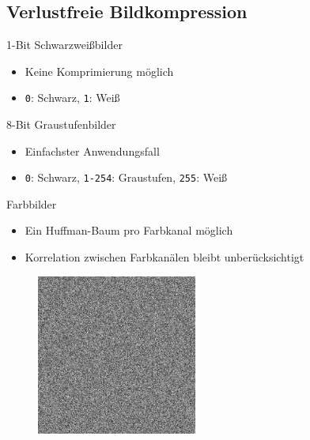 \documentclass[xcolor=dvipsnames,presentation]{beamer}    %
\newenvironment{witemize}{\itemize\setlength{\itemsep}{1em}}{\enditemize}
\begin{document}
\subsection{Verlustfreie Bildkompression}

\begin{frame}{\insertsubsection}
\begin{witemize}
\item<1-> 1-Bit Schwarzweißbilder
  \begin{itemize}
    \item Keine Komprimierung möglich
    \item {\tt0}: Schwarz, {\tt1}: Weiß
  \end{itemize}

\item<2-> 8-Bit Graustufenbilder
  \begin{itemize}
    \item Einfachster Anwendungsfall
    \item {\tt0}: Schwarz, {\tt1-254}: Graustufen, {\tt255}: Weiß
  \end{itemize}

\item<3-> Farbbilder
  \begin{itemize}
    \item Ein Huffman-Baum pro Farbkanal möglich
    \item Korrelation zwischen Farbkanälen bleibt unberücksichtigt
  \end{itemize}
\end{witemize}
\end{frame}

\begin{frame}{\insertsubsection}
\begin{figure}[T]
  \centering
  \includegraphics[width=0.470\textwidth]{bilder/uniformnoise.png}
  \hfill
\end{figure}
\end{frame}
\end{document}
